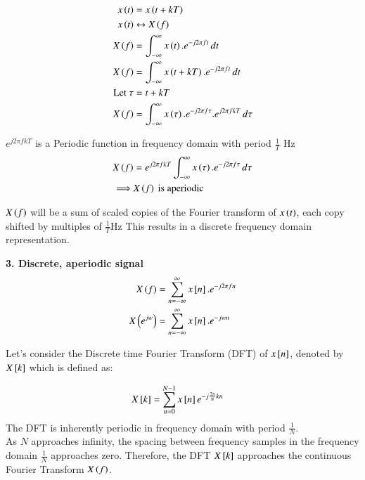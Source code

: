 \documentclass[journal,12pt,onecolumn]{IEEEtran}
\theoremstyle{remark}
\begin{document}
\begin{align}
x\left(t\right)&=x\left(t+kT\right)\\
x\left(t\right)& \leftrightarrow X\left(f\right)\\
X\left(f\right)&=\int_{-\infty}^{\infty} x\left(t\right).e^{-j2\pi ft}\,dt\\
X\left(f\right)&=\int_{-\infty}^{\infty} x\left(t+kT\right).e^{-j2\pi ft}\,dt\\
\text{Let } \tau &= t+kT\\
X\left(f\right)&=\int_{-\infty}^{\infty} x\left(\tau\right).e^{-j2\pi f\tau}.e^{j2\pi fkT}\,d\tau
\end{align}

$e^{j2\pi fkT} $ is a Periodic function in frequency domain with period $\frac{1}{T}$ Hz \\
\begin{align}
X\left(f\right)&=e^{j2\pi fkT}\int_{-\infty}^{\infty} x\left(\tau\right).e^{-j2\pi f\tau}\,d\tau\\
\implies &X\left(f\right) \text{ is aperiodic}
\end{align}


$X\left(f\right)$ will be  a sum of scaled copies of the Fourier transform of $x\left(t\right)$, each copy shifted by multiples of $\frac{1}{T}$Hz This results in a discrete frequency domain representation.\\
\vspace{2mm}


\textbf{3. Discrete, aperiodic signal}\\

\begin{align}
X\left(f\right)&= \sum_{n=-\infty}^{\infty} x{}\left[n\right].e^{-j2\pi fn}\\
X\left(e^{jw}\right)&= \sum_{n=-\infty}^{\infty} x{}\left[n\right].e^{-jwn}
\end{align}

Let's consider the Discrete time Fourier Transform (DFT) of $x{}\left[n\right]$, denoted by $ X{}\left[k\right]$ which is defined as:

\begin{align}
X{}\left[k\right]&=\sum_{n=0}^{N-1}x{}\left[n\right]e^{-j\frac{2\pi}{N}kn}
\end{align}
The DFT is inherently periodic in frequency domain with period $\frac{1}{N}$.\\


As  $N$ approaches infinity, the spacing between frequency samples in the frequency domain  $\frac{1}{N}$  approaches zero. Therefore, the DFT $X{}\left[k\right]$ approaches the continuous Fourier Transform $X\left(f\right)$. \\
\end{document}
